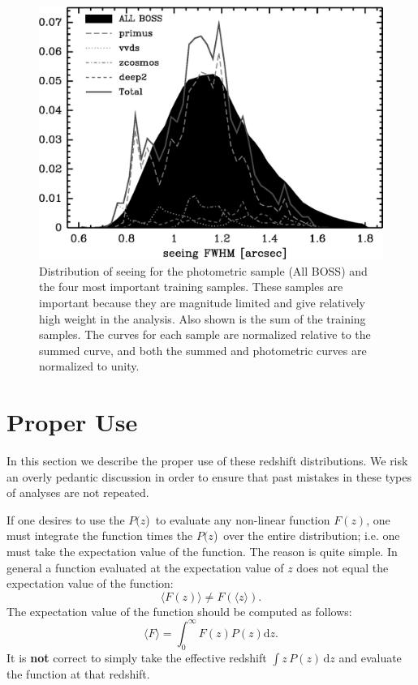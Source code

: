 \documentclass[12pt,preprint]{aastex}
\newcommand{\pofz}{$P(z$)}
\begin{document}
\begin{figure}[h]\centering
    \includegraphics[scale=0.7]{figures/primus-vvds-zcosmos-deep2-match-seeing-10-bw.eps}

    \caption{Distribution of seeing for the photometric sample (All BOSS) and
    the four most important training samples.  These samples are important
    because they are magnitude limited and give relatively high weight in the
    analysis.  Also shown is the sum of the training samples.  The curves for
    each sample are normalized relative to the summed curve,  and both the
    summed and photometric curves are normalized to unity.}

    \label{fig:seeing}
\end{figure}



\section{Proper Use} \label{sec:usage}

In this section we describe the proper use of these redshift distributions.
We risk an overly pedantic discussion in order to ensure that past
mistakes in these types of analyses are not repeated.

If one desires to use the \pofz\ to evaluate any non-linear function $F(z)$,
one must integrate the function times the \pofz\ over the entire distribution;
i.e. one must take the expectation value of the function.  The reason is quite
simple. In general a function evaluated at the expectation value of $z$ does not
equal the expectation value of the function:
\begin{equation}
\langle F(z) \rangle \ne F(\langle z \rangle).
\end{equation}
The expectation value of the function should be computed as follows:
\begin{equation}
\langle F \rangle = \int_{0}^{\infty} F(z) P(z) \mathrm{d}z.
\end{equation}
It is {\bf not} correct to simply take the effective redshift $\int
z\,P(z)\,\mathrm{d}z$ and evaluate
the function at that redshift.
\end{document}

